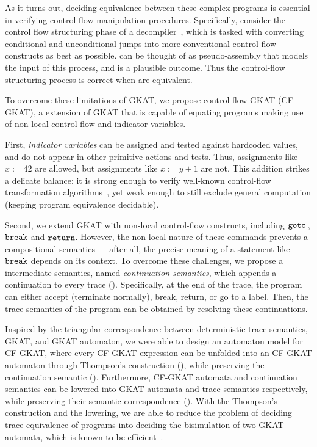 As it turns out, deciding equivalence between these complex programs is essential in verifying control-flow manipulation procedures.
Specifically, consider the control flow structuring phase of a decompiler~\cite{cifuentes-1994}, which is tasked with converting conditional and unconditional jumps into more conventional control flow constructs as best as possible.
 can be thought of as pseudo-assembly that models the input of this process, and  is a plausible outcome.
Thus the control-flow structuring process is correct when  are equivalent.

To overcome these limitations of GKAT, we propose control flow GKAT (CF-GKAT), a extension of GKAT that is capable of equating programs making use of non-local control flow and indicator variables.

First, \emph{indicator variables} can be assigned and tested against hardcoded values, and do not appear in other primitive actions and tests.
Thus, assignments like $x := 42$ are allowed, but assignments like $x := y + 1$ are not.
This addition strikes a delicate balance: it is strong enough to verify well-known control-flow transformation algorithms~\cite{yakdan_NoMoreGotos_2015,erosa-hendren-1994}, yet weak enough to still exclude general computation (keeping program equivalence decidable).

Second, we extend GKAT with non-local control-flow constructs, including \(\mathtt{goto}~\!\), \(\mathtt{break}\) and \(\mathtt{return}\).
However, the non-local nature of these commands prevents a compositional semantics --- after all, the precise meaning of a statement like \(\mathtt{break}\) depends on its context.
To overcome these challenges, we propose a intermediate semantics, named \emph{continuation semantics}, which appends a continuation to every trace (). 
Specifically, at the end of the trace, the program can either accept (terminate normally), break, return, or go to a label.
Then, the trace semantics of the program can be obtained by resolving these continuations.

Inspired by the triangular correspondence between deterministic trace semantics, GKAT, and GKAT automaton, we were able to design an automaton model for CF-GKAT, where every CF-GKAT expression can be unfolded into an CF-GKAT automaton through Thompson's construction (), while preserving the continuation semantic (). 
Furthermore, CF-GKAT automata and continuation semantics can be lowered into GKAT automata and trace semantics respectively, while preserving their semantic correspondence (). 
With the Thompson's construction and the lowering, we are able to reduce the problem of deciding trace equivalence of programs into deciding the bisimulation of two GKAT automata, which is known to be efficient~\cite{Smolka_Foster_Hsu_Kappé_Kozen_Silva_2020}. 

